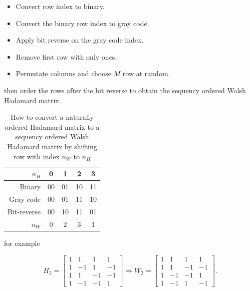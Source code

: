 \begin{itemize}
    \item Convert row index to binary.
    \item Convert the binary row index to gray code.
    \item Apply bit reverse on the gray code index.
    \item Remove first row with only ones.
    \item Permutate columns and choose $M$ row at random.
\end{itemize}

then order the rows after the bit reverse to obtain the sequency ordered Walsh Hadamard matrix.

\begin{table}[H]
\begin{tabular}{|r|c|c|c|c|}
\hline
    $n_H$        & 0    & 1     & 2     & 3     \\ \hline
    Binary       & 00   & 01    & 10    & 11    \\ \hline
    Gray code    & 00   & 01    & 11    & 10    \\ \hline
    Bit-reverse  & 00   & 10    & 11    & 01    \\ \hline
    $n_W$        & 0    & 2     & 3     & 1     \\ \hline
    
\end{tabular}
\label{tab:Hadamard_2_Walsh}
\caption{How to convert a naturally ordered Hadamard matrix to a sequency ordered Walsh Hadamard matrix by shifting row with index $n_W$ to $n_H$}
\end{table}

for example

\begin{equation}
    H_2 =  \begin{bmatrix}
       1 & 1 & 1 & 1 \\
       1 & -1 & 1 & -1 \\
       1 & 1 & -1 & -1 \\
       1 & -1 & -1 & 1 
       \end{bmatrix} \Rightarrow W_2 = \begin{bmatrix}
       1 & 1 & 1 & 1 \\
       1 & 1 & -1 & -1  \\
       1 & -1 & -1 & 1  \\
       1 & -1 & 1 & -1 
       \end{bmatrix}.
\end{equation}

